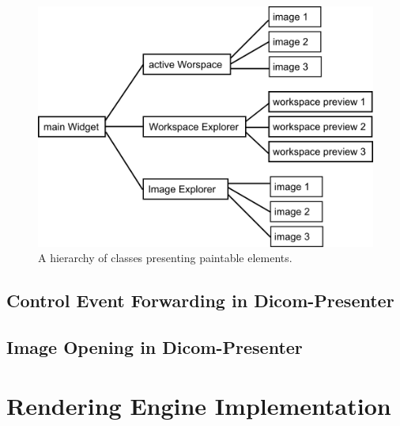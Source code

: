 \begin{figure}
	\begin{center}
	\includegraphics[width=130mm]{Text/IMG/paint.png}
	\end{center}
	\caption{A hierarchy of classes presenting paintable elements.}
	\label{paint}
\end{figure}

\subsection{Control Event Forwarding in Dicom-Presenter}

\subsection{Image Opening in Dicom-Presenter}





\section{Rendering Engine Implementation}

